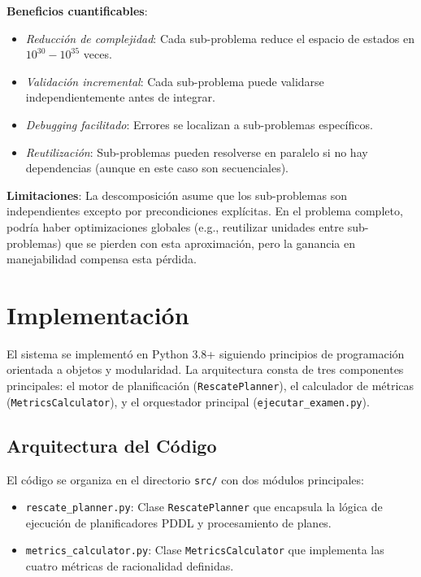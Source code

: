 \documentclass[conference]{IEEEtran}
\begin{document}
    \textbf{Beneficios cuantificables}:
    \begin{itemize}[leftmargin=*,itemsep=1pt]
    \item \textit{Reducción de complejidad}: Cada sub-problema reduce el espacio de estados en $10^{30}-10^{35}$ veces.
    \item \textit{Validación incremental}: Cada sub-problema puede validarse independientemente antes de integrar.
    \item \textit{Debugging facilitado}: Errores se localizan a sub-problemas específicos.
    \item \textit{Reutilización}: Sub-problemas pueden resolverse en paralelo si no hay dependencias (aunque en este caso son secuenciales).
    \end{itemize}

    \textbf{Limitaciones}: La descomposición asume que los sub-problemas son independientes excepto por precondiciones explícitas. En el problema completo, podría haber optimizaciones globales (e.g., reutilizar unidades entre sub-problemas) que se pierden con esta aproximación, pero la ganancia en manejabilidad compensa esta pérdida.

    \section{Implementación}

    El sistema se implementó en Python 3.8+ siguiendo principios de programación orientada a objetos y modularidad. La arquitectura consta de tres componentes principales: el motor de planificación (\texttt{RescatePlanner}), el calculador de métricas (\texttt{MetricsCalculator}), y el orquestador principal (\texttt{ejecutar\_examen.py}).

    \subsection{Arquitectura del Código}

    El código se organiza en el directorio \texttt{src/} con dos módulos principales:

    \begin{itemize}[leftmargin=*,itemsep=1pt]
    \item \texttt{rescate\_planner.py}: Clase \texttt{RescatePlanner} que encapsula la lógica de ejecución de planificadores PDDL y procesamiento de planes.
    \item \texttt{metrics\_calculator.py}: Clase \texttt{MetricsCalculator} que implementa las cuatro métricas de racionalidad definidas.
    \end{itemize}
\end{document}
